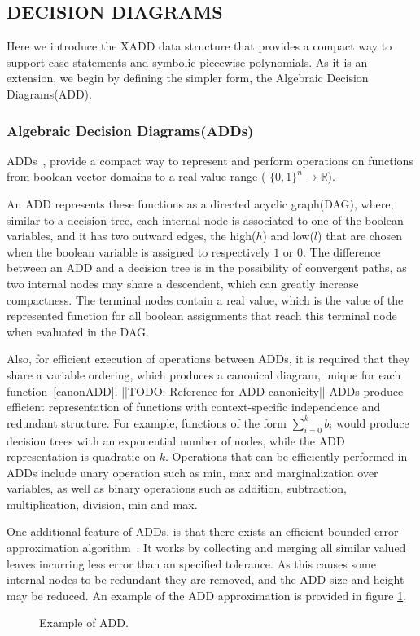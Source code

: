 

\subsection {\bf DECISION DIAGRAMS}
Here we introduce the XADD data structure that provides a compact way to support case statements and symbolic piecewise polynomials. As it is an extension, we begin by defining the simpler form, the Algebraic Decision Diagrams(ADD).

\subsubsection{Algebraic Decision Diagrams(ADDs)} 

ADDs~\cite{bahar93add}, provide a compact way to represent and perform operations on functions from boolean vector domains to a real-value range ( $\{ 0, 1\}^n \rightarrow \mathbb{R}$). 

An ADD represents these functions as a directed acyclic graph(DAG), where, similar to a decision tree, each internal node is associated to one of the boolean variables, and it has two outward edges, the high($h$) and low($l$) that are chosen when the boolean variable is assigned to respectively $1$ or $0$. The difference between an ADD and a decision tree is in the possibility of convergent paths, as two internal nodes may share a descendent, which can greatly increase compactness. The terminal nodes contain a real value, which is the value of the represented function for all boolean assignments that reach this terminal node when evaluated in the DAG.

 Also, for efficient execution of operations between ADDs, it is required that they share a variable ordering, which produces a canonical diagram, unique for each function~\ref{canonADD}. ||TODO: Reference for ADD canonicity|| ADDs produce efficient representation of functions with context-specific independence and redundant structure. For example, functions of the form $\sum_{i=0}^k b_i$ would produce decision trees with an exponential number of nodes, while the ADD representation is quadratic on $k$. Operations that can be efficiently performed in ADDs include unary operation such as min, max and marginalization over variables, as well as binary operations such as addition, subtraction, multiplication, division, min and max.

One additional feature of ADDs, is that there exists an efficient bounded error approximation algorithm~\cite{apricodd}. It works by collecting and merging all similar valued leaves incurring less error than an specified tolerance. As this causes some internal nodes to be redundant they are removed, and the ADD size and height may be reduced. An example of the ADD approximation is provided in figure \ref{fig:addapprox}.

\begin{figure}[h!t]
\center
{}
\caption{ Example of ADD.}
\label{fig:addapprox} 
\end{figure}
